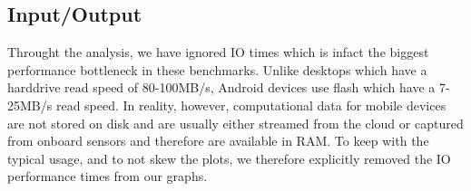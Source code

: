 \subsection{Input/Output}

Throught the analysis, we have ignored IO times which is infact the biggest performance bottleneck in these benchmarks.
Unlike desktops which have a harddrive read speed of 80-100MB/s, Android devices use flash which have a 7-25MB/s read speed.
In reality, however, computational data for mobile devices are not stored on disk and are usually either streamed from the cloud or captured from onboard sensors and therefore are available in RAM.
To keep with the typical usage, and to not skew the plots, we therefore explicitly removed the IO performance times from our graphs.
